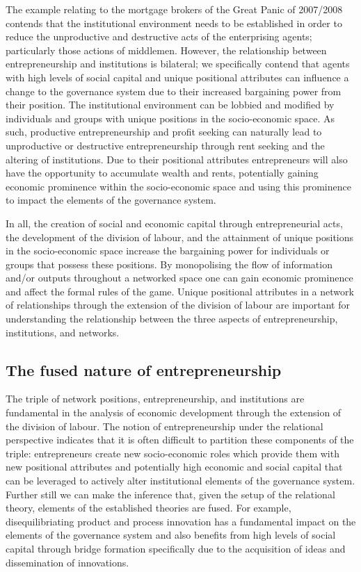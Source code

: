 The example relating to the mortgage brokers of the Great Panic of 2007/2008 contends that the institutional environment needs to be established in order to reduce the unproductive and destructive acts of the enterprising agents; particularly those actions of middlemen. However, the relationship between entrepreneurship and institutions is bilateral; we specifically contend that agents with high levels of social capital and unique positional attributes can influence a change to the governance system due to their increased bargaining power from their position. The institutional environment can be lobbied and modified by individuals and groups with unique positions in the socio-economic space. As such, productive entrepreneurship and profit seeking can naturally lead to unproductive or destructive entrepreneurship through rent seeking and the altering of institutions. Due to their positional attributes entrepreneurs will also have the opportunity to accumulate wealth and rents, potentially gaining economic prominence within the socio-economic space and using this prominence to impact the elements of the governance system.

In all, the creation of social and economic capital through entrepreneurial acts, the development of the division of labour, and the attainment of unique positions in the socio-economic space increase the bargaining power for individuals or groups that possess these positions. By monopolising the flow of information and/or outputs throughout a networked space one can gain economic prominence and affect the formal rules of the game. Unique positional attributes in a network of relationships through the extension of the division of labour are important for understanding the relationship between the three aspects of entrepreneurship, institutions, and networks.

\subsection{The fused nature of entrepreneurship}

The triple of network positions, entrepreneurship, and institutions are fundamental in the analysis of economic development through the extension of the division of labour. The notion of entrepreneurship under the relational perspective indicates that it is often difficult to partition these components of the triple: entrepreneurs create new socio-economic roles which provide them with new positional attributes and potentially high economic and social capital that can be leveraged to actively alter institutional elements of the governance system. Further still we can make the inference that, given the setup of the relational theory, elements of the established theories are fused. For example, disequilibriating product and process innovation has a fundamental impact on the elements of the governance system and also benefits from high levels of social capital through bridge formation specifically due to the acquisition of ideas and dissemination of innovations.

